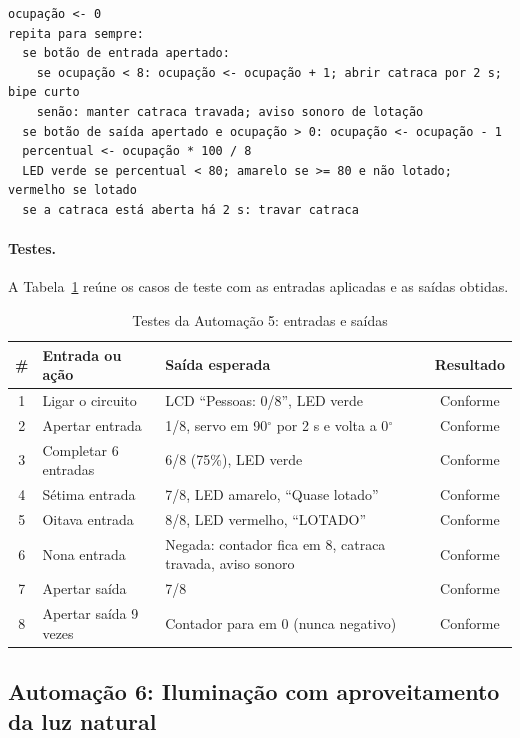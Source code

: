 \documentclass[12pt]{article}
\newcommand{\conf}{Conforme}
\begin{document}
\begin{lstlisting}[style=pseudo]
ocupação <- 0
repita para sempre:
  se botão de entrada apertado:
    se ocupação < 8: ocupação <- ocupação + 1; abrir catraca por 2 s; bipe curto
    senão: manter catraca travada; aviso sonoro de lotação
  se botão de saída apertado e ocupação > 0: ocupação <- ocupação - 1
  percentual <- ocupação * 100 / 8
  LED verde se percentual < 80; amarelo se >= 80 e não lotado; vermelho se lotado
  se a catraca está aberta há 2 s: travar catraca
\end{lstlisting}

\paragraph{Testes.} A Tabela~\ref{tab:teste5} reúne os casos de teste com as entradas aplicadas e as saídas obtidas.

\begin{table}[!htb]
\centering
\caption{Testes da Automação 5: entradas e saídas}\label{tab:teste5}
\small
\begin{tabularx}{\textwidth}{cXXc}
\toprule
\# & Entrada ou ação & Saída esperada & Resultado \\
\midrule
1 & Ligar o circuito & LCD ``Pessoas: 0/8'', LED verde & \conf \\
2 & Apertar entrada & 1/8, servo em 90$^\circ$ por 2 s e volta a 0$^\circ$ & \conf \\
3 & Completar 6 entradas & 6/8 (75\%), LED verde & \conf \\
4 & Sétima entrada & 7/8, LED amarelo, ``Quase lotado'' & \conf \\
5 & Oitava entrada & 8/8, LED vermelho, ``LOTADO'' & \conf \\
6 & Nona entrada & Negada: contador fica em 8, catraca travada, aviso sonoro & \conf \\
7 & Apertar saída & 7/8 & \conf \\
8 & Apertar saída 9 vezes & Contador para em 0 (nunca negativo) & \conf \\
\bottomrule
\end{tabularx}
\end{table}



\subsection{Automação 6: Iluminação com aproveitamento da luz natural}\label{sub:a6}
\end{document}
